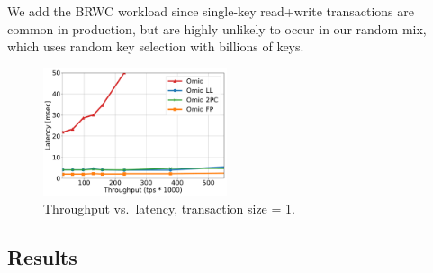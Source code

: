 We add the BRWC workload since single-key read+write transactions are common in production, but are highly unlikely to 
occur in our random mix, which uses random key selection with billions of keys.

\begin{figure}[ht]
	\centering
      	\includegraphics[width=0.48\textwidth]{figs/throughputlatency1.pdf}
	    \caption{Throughput vs.\ latency, transaction size = 1.}
        \label{fig:tl-1}      
\end{figure}


\subsection{Results}
\label{ssec:results}

